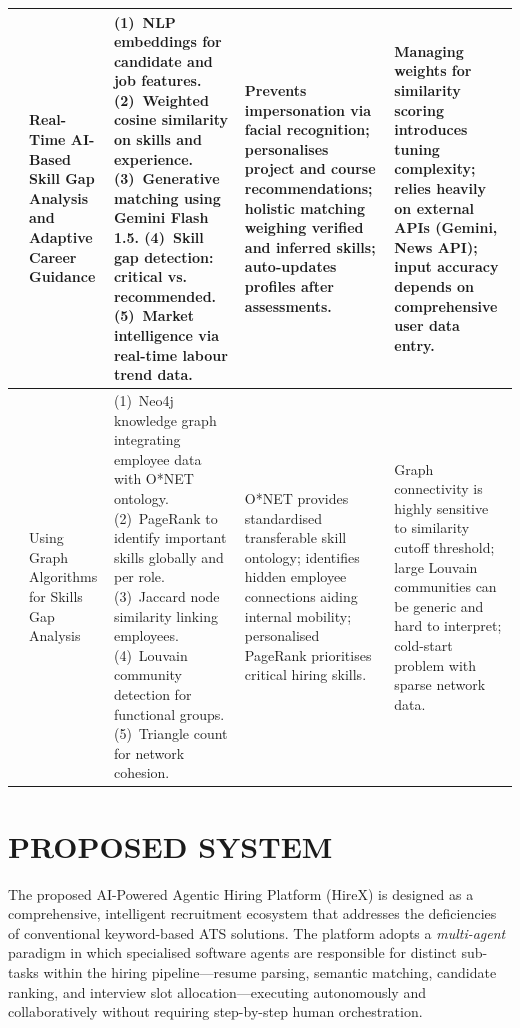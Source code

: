 \documentclass[12pt,a4paper]{report}
\begin{document}
\begin{longtable}{|>{\centering\arraybackslash}p{0.6cm}|p{3.1cm}|p{3.6cm}|p{3.2cm}|p{3.2cm}|}
19 &
Real-Time AI-Based Skill Gap Analysis and Adaptive Career Guidance \cite{ref19} &
(1)~NLP embeddings for candidate and job features. (2)~Weighted cosine similarity on skills and experience. (3)~Generative matching using Gemini Flash 1.5. (4)~Skill gap detection: critical vs. recommended. (5)~Market intelligence via real-time labour trend data. &
Prevents impersonation via facial recognition; personalises project and course recommendations; holistic matching weighing verified and inferred skills; auto-updates profiles after assessments. &
Managing weights for similarity scoring introduces tuning complexity; relies heavily on external APIs (Gemini, News API); input accuracy depends on comprehensive user data entry. \\
\hline

20 &
Using Graph Algorithms for Skills Gap Analysis \cite{ref20} &
(1)~Neo4j knowledge graph integrating employee data with O*NET ontology. (2)~PageRank to identify important skills globally and per role. (3)~Jaccard node similarity linking employees. (4)~Louvain community detection for functional groups. (5)~Triangle count for network cohesion. &
O*NET provides standardised transferable skill ontology; identifies hidden employee connections aiding internal mobility; personalised PageRank prioritises critical hiring skills. &
Graph connectivity is highly sensitive to similarity cutoff threshold; large Louvain communities can be generic and hard to interpret; cold-start problem with sparse network data. \\
\hline

\end{longtable}
\endgroup

\chapter{PROPOSED SYSTEM}

The proposed AI-Powered Agentic Hiring Platform (HireX) is designed as a comprehensive, intelligent recruitment ecosystem that addresses the deficiencies of conventional keyword-based ATS solutions. The platform adopts a \textit{multi-agent} paradigm in which specialised software agents are responsible for distinct sub-tasks within the hiring pipeline---resume parsing, semantic matching, candidate ranking, and interview slot allocation---executing autonomously and collaboratively without requiring step-by-step human orchestration.
\end{document}
